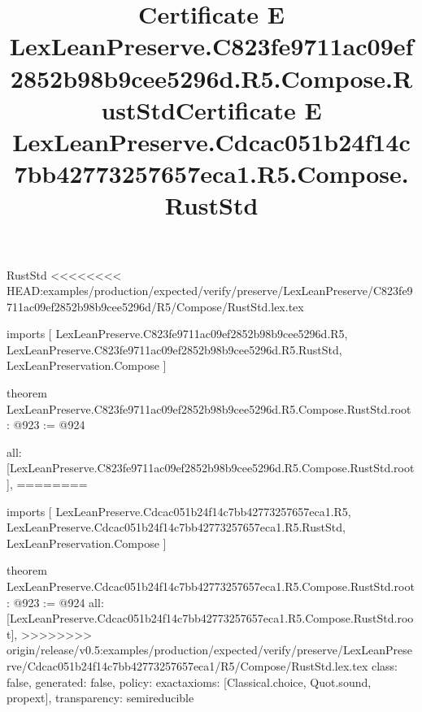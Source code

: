 \begin{lexlean}{RustStd}
<<<<<<<< HEAD:examples/production/expected/verify/preserve/LexLeanPreserve/C823fe9711ac09ef2852b98b9cee5296d/R5/Compose/RustStd.lex.tex
\title{Certificate E LexLeanPreserve.C823fe9711ac09ef2852b98b9cee5296d.R5.Compose.RustStd}
\begin{coremodule}
imports [
  LexLeanPreserve.C823fe9711ac09ef2852b98b9cee5296d.R5,
  LexLeanPreserve.C823fe9711ac09ef2852b98b9cee5296d.R5.RustStd,
  LexLeanPreservation.Compose
]

theorem LexLeanPreserve.C823fe9711ac09ef2852b98b9cee5296d.R5.Compose.RustStd.root : @923 := @924 {
  all: [LexLeanPreserve.C823fe9711ac09ef2852b98b9cee5296d.R5.Compose.RustStd.root],
========
\title{Certificate E LexLeanPreserve.Cdcac051b24f14c7bb42773257657eca1.R5.Compose.RustStd}
\begin{coremodule}
imports [
  LexLeanPreserve.Cdcac051b24f14c7bb42773257657eca1.R5,
  LexLeanPreserve.Cdcac051b24f14c7bb42773257657eca1.R5.RustStd,
  LexLeanPreservation.Compose
]

theorem LexLeanPreserve.Cdcac051b24f14c7bb42773257657eca1.R5.Compose.RustStd.root : @923 := @924 {
  all: [LexLeanPreserve.Cdcac051b24f14c7bb42773257657eca1.R5.Compose.RustStd.root],
>>>>>>>> origin/release/v0.5:examples/production/expected/verify/preserve/LexLeanPreserve/Cdcac051b24f14c7bb42773257657eca1/R5/Compose/RustStd.lex.tex
  class: false,
  generated: false,
  policy: exact{axioms: [Classical.choice, Quot.sound, propext]},
  transparency: semireducible
}


\end{coremodule}}
\end{coremodule}
\end{lexlean}
